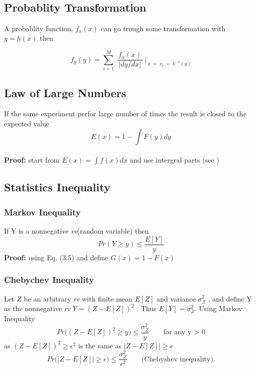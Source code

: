 ~\vspace{-2.5em}
\subsection{Probablity Transformation}
A probablity function, $f_x(x)$ can go trough some transformation with $y = h(x)$ then

\begin{equation}
f_y(y) = \sum_{i=1}^M ~\frac{f_x(x)}{~|dy/dx|~}~\biggr\rvert_{~x~=~x_i~=~h^{-1}(y)}
\end{equation}

\subsection{Law of Large Numbers}
If the same experiment perfor large number of times the result is closed to the expected value
\begin{equation}
E(x) = 1 - \int F(y) dy
\end{equation}
~\\\textbf{Proof:}
start from $E(x) = \int f(x) dx$ and use intergral parts (see  \cite{markov})
\subsection{Statistics Inequality}
\subsubsection{Markov Inequality}
If Y is a nonnegative \emph{rv}(random variable) then
$$Pr(Y \geq y) \leq \frac{E[Y]}{y}$$
\textbf{Proof:}
using Eq. (3.5) and define $G(x) = 1 - F(x)$
\subsubsection{Chebychev Inequality}
Let $Z$ be an arbitrary \emph{rv} with finite mean $E[Z]$ and variance $\sigma_Z^2$ , and define Y as the nonnegative \emph{rv} $Y = (Z - E [Z])^2$ . Thus $E [Y] = \sigma_Z^2$. Using Markov Inequality
~\\
$$ Pr\Big((Z-E[Z])^2 \geq y\Big) \leq \frac{\sigma_Z^2}{y} \hspace{2em} \text{for any y > 0}$$
as $ (Z-E[Z])^2 \geq \epsilon^2 $ is the same as $ |Z-E[Z]| \geq \epsilon $
$$ Pr\Big(|Z-E[Z]| \geq \epsilon\Big) \leq \frac{\sigma_Z^2}{\epsilon^2} \hspace{2em} \text{(Chebyshev inequality).}$$
